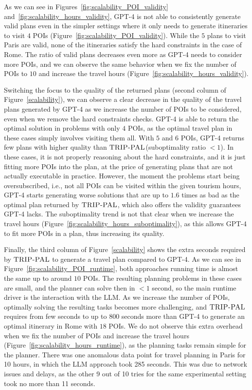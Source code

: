 \documentclass[letterpaper]{article}
\newcommand{\gpt}{{\sc GPT-4}\xspace}
\newcommand{\approach}{\ensuremath{\textsc{TRIP-PAL}}\xspace}
\begin{document}
As we can see in Figures~\ref{fig:scalability_POI_validity} and~\ref{fig:scalability_hours_validity}, \gpt is not able to consistently generate valid plans even in the simpler settings where it only needs to generate itineraries to visit $4$ POIs (Figure~\ref{fig:scalability_POI_validity}). While the $5$ plans to visit Paris are valid, none of the itineraries satisfy the hard constraints in the case of Rome.
The ratio of valid plans decreases even more as \gpt needs to consider more POIs, and we can observe the same behavior when we fix the number of POIs to $10$ and increase the travel hours (Figure~\ref{fig:scalability_hours_validity}).

Switching the focus to the quality of the returned plans (second column of Figure~\ref{scalability}), we can observe a clear decrease in the quality of the travel plans generated by \gpt as we increase the number of POIs to be considered, even when we remove the hard constraints checks.
\gpt is able to return the optimal solution in problems with only $4$ POIs, as the optimal travel plan in these cases simply involves visiting them all.
With $5$ and $6$ POIs, \gpt returns few plans with higher quality than \approach (suboptimality ratio $<1$).
In these cases, it is not properly reasoning about the hard constraints, and it is just fitting more POIs into the plan, at the price of generating plans that are not actually executable in practice.
However, the moment the problems start being oversubscribed, i.e., not all POIs can be visited within the given tourism hours, \gpt starts generating worse solutions that are up to $1.6$ times as bad as the optimal plan returned by \approach, which also offers the validity guarantees \gpt lacks.
The suboptimality trend is not that clear when we increase the travel hours (Figure~\ref{fig:scalability_hours_suboptimality}), as this allows \gpt to fit more POIs in a plan, thus increasing its quality.

Finally, the third column of Figure~\ref{scalability} shows the extra seconds required by \approach to generate a travel plan compared to \gpt.
As we can see in Figure~\ref{fig:scalability_POI_runtime}, both approaches running time is almost the same up to around $10$ POIs.
The resulting planning problems in these cases are small, and the planner can solve then in $<1$ second, so the main runtime driver is the interaction with the LLM.
As we increase the number of POIs, optimally solving the resulting tasks becomes more challenging, and \approach requires from few seconds to up to $800$ seconds more than \gpt to generate an optimal itinerary in Rome with $18$ POIs.
We do not observe this extra overhead when we fix the number of POIs and increase the travel hours (Figure~\ref{fig:scalability_hours_runtime}), as the planning tasks remain simple for the planner.
There was one anomalous data point for travel planning in Paris for 10 hours, in which the LLM approach took 285 seconds. This was due to network issues and delays, as the other 9 out of 10 tries for the same experimental setting took no more than 11 seconds. 
\end{document}
